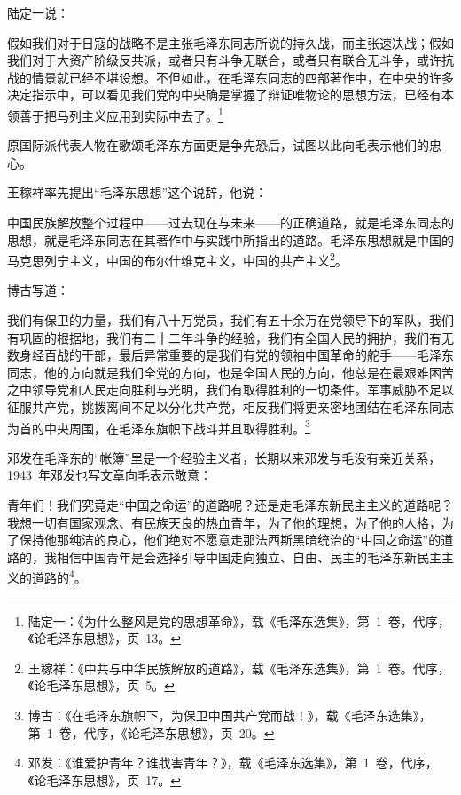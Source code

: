 陆定一说：

\begin{quoting}
假如我们对于日寇的战略不是主张毛泽东同志所说的持久战，而主张速决战；假如我们对于大资产阶级反共派，或者只有斗争无联合，或者只有联合无斗争，或许抗战的情景就已经不堪设想。不但如此，在毛泽东同志的四部著作中，在中央的许多决定指示中，可以看见我们党的中央确是掌握了辩证唯物论的思想方法，已经有本领善于把马列主义应用到实际中去了。\footnote{陆定一：《为什么整风是党的思想革命》，载《毛泽东选集》，第~1~卷，代序，《论毛泽东思想》，页~13。}
\end{quoting}

原国际派代表人物在歌颂毛泽东方面更是争先恐后，试图以此向毛表示他们的忠心。

王稼祥率先提出“毛泽东思想”这个说辞，他说：

\begin{quoting}
中国民族解放整个过程中——过去现在与未来——的正确道路，就是毛泽东同志的思想，就是毛泽东同志在其著作中与实践中所指出的道路。毛泽东思想就是中国的马克思列宁主义，中国的布尔什维克主义，中国的共产主义\footnote{王稼祥：《中共与中华民族解放的道路》，载《毛泽东选集》，第~1~卷。代序，《论毛泽东思想》，页~5。}。
\end{quoting}

博古写道：

\begin{quoting}
我们有保卫的力量，我们有八十万党员，我们有五十余万在党领导下的军队，我们有巩固的根据地，我们有二十二年斗争的经验，我们有全国人民的拥护，我们有无数身经百战的干部，最后异常重要的是我们有党的领袖中国革命的舵手——毛泽东同志，他的方向就是我们全党的方向，也是全国人民的方向，他总是在最艰难困苦之中领导党和人民走向胜利与光明，我们有取得胜利的一切条件。军事威胁不足以征服共产党，挑拨离间不足以分化共产党，相反我们将更亲密地团结在毛泽东同志为首的中央周围，在毛泽东旗帜下战斗并且取得胜利。\footnote{博古：《在毛泽东旗帜下，为保卫中国共产党而战！》，载《毛泽东选集》，第~1~卷，代序，《论毛泽东思想》，页~20。}
\end{quoting}

邓发在毛泽东的“帐簿”里是一个经验主义者，长期以来邓发与毛没有亲近关系，1943~年邓发也写文章向毛表示敬意：

\begin{quoting}
青年们！我们究竟走“中国之命运”的道路呢？还是走毛泽东新民主主义的道路呢？我想一切有国家观念、有民族天良的热血青年，为了他的理想，为了他的人格，为了保持他那纯洁的良心，他们绝对不愿意走那法西斯黑暗统治的“中国之命运”的道路的，我相信中国青年是会选择引导中国走向独立、自由、民主的毛泽东新民主主义的道路的\footnote{邓发：《谁爱护青年？谁戕害青年？》，载《毛泽东选集》，第~1~卷，代序，《论毛泽东思想》，页~17。}。
\end{quoting}

